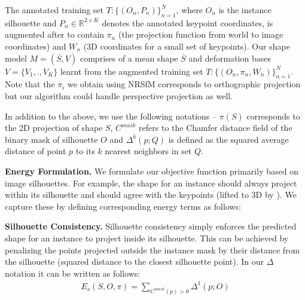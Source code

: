 
The annotated training set $T:\{(O_n, P_n)\}_{n=1}^N$, where $O_n$ is the instance silhouette and $P_n \in \mathbb{R}^{2 \times K}$ denotes the annotated keypoint coordinates, is augmented after \nrsfm to contain $\pi_n$ (the projection function from world to image coordinates) and $W_n$ (3D coordinates for a small set of keypoints).
Our shape model $M = (\overline{S},V)$ comprises of a mean shape $\overline{S}$ and deformation bases $V = \{ V_1,.,V_K \} $ learnt from the augmented training set $T:\{(O_n,\pi_n, W_n)\}_{n=1}^N$. Note that the $\pi_i$ we obtain using NRSfM corresponds to orthographic projection but our algorithm could handle perspective projection as well.

In addition to the above, we use the following notations  --  $\pi(S)$ corresponds to the 2D projection of shape $S$, $C^{mask}$ refers to the Chamfer distance field of the binary mask of silhouette $O$ and $\Delta^k(p;Q)$ is defined as the squared average distance of point $p$ to its $k$ nearest neighbors in set $Q$.


\vspace{3mm}
\noindent \textbf{Energy Formulation.} We formulate our objective function primarily based on image silhouettes. For example, the shape for an instance should always project within its silhouette and should agree with the keypoints (lifted to 3D by \nrsfm). We capture these by defining corresponding energy terms as follows:

\vspace{3mm}
\noindent \textbf{Silhouette Consistency.} Silhouette consistency simply enforces the predicted shape for an instance to project inside its silhouette. This can be achieved by penalizing the points projected outside the instance mask by their distance from the silhouette (\ie squared distance to the closest silhouette point). In our $\Delta$ notation it can be written as follows:
\begin{gather}
 \label{eq:sil_con}E_{s}(S,O,\pi)=\underset{C^{mask}(p)>0}{\sum}\Delta^1(p;O)
 \end{gather}

